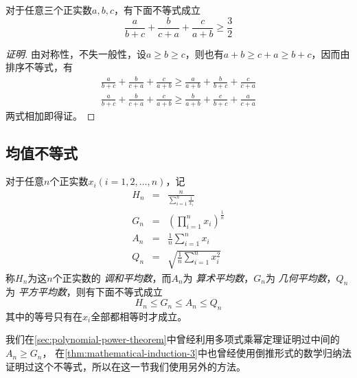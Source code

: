 \begin{example}
  \label{example:nesbitt-inequality-proof-by-sorted-inequality}
  对于任意三个正实数$a,b,c$，有下面不等式成立
  \begin{equation}
    \label{eq:nesbitt-inequality}
    \frac{a}{b+c} + \frac{b}{c+a} + \frac{c}{a+b} \geqslant \frac{3}{2}
  \end{equation}

  \begin{proof}[证明]
    由对称性，不失一般性，设$a\geqslant b \geqslant c$，则也有$a+b \geqslant c+a \geqslant b+c$，因而由排序不等式，有
    \begin{eqnarray*}
     \frac{a}{b+c} + \frac{b}{c+a} + \frac{c}{a+b} \geqslant \frac{a}{a+b} + \frac{b}{b+c} + \frac{c}{c+a} \\ 
     \frac{a}{b+c} + \frac{b}{c+a} + \frac{c}{a+b} \geqslant \frac{b}{a+b} + \frac{c}{b+c} + \frac{a}{c+a}  
    \end{eqnarray*}
    两式相加即得证。
  \end{proof}
\end{example}


\subsection{均值不等式}

\begin{theorem}[均值不等式]
  对于任意$n$个正实数$x_{i}(i=1,2,\ldots,n)$，记
  \begin{eqnarray}
    \label{eq:definition-of-average}
    H_n &=& \frac{n}{\sum_{i=1}^n \frac{1}{x_i}} \\
    G_n &=& (\prod_{i=1}^nx_{i})^{\frac{1}{n}} \\
    A_n &=& \frac{1}{n}\sum_{i=1}^{n}x_i \\
    Q_n &=& \sqrt{\frac{1}{n}\sum_{i=1}^nx_i^2}
  \end{eqnarray}
  称$H_{n}$为这$n$个正实数的 \emph{调和平均数}，而$A_{n}$为 \emph{算术平均数}，$G_n$为 \emph{几何平均数}，$Q_{n}$为 \emph{平方平均数}，则有下面不等式成立
  \begin{equation}
    \label{eq:mean-inequation-general}
    H_{n} \leqslant G_{n} \leqslant A_{n} \leqslant Q_{n}
  \end{equation}
  其中的等号只有在$x_{i}$全部都相等时才成立。
\end{theorem}

我们在\autoref{sec:polynomial-power-theorem}中曾经利用多项式乘幂定理证明过中间的$A_n \geqslant G_n$，
在\autoref{thm:mathematical-induction-3}中也曾经使用倒推形式的数学归纳法证明过这个不等式，所以在这一节我们使用另外的方法。

